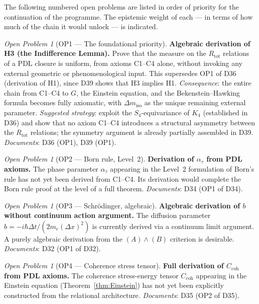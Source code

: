 \documentclass[11pt,a4paper]{article}
\theoremstyle{plain}
\theoremstyle{definition}
\theoremstyle{remark}
\newtheorem{openproblem}[theorem]{Open Problem}
\newcommand{\Kfour}{K_4}
\newcommand{\Rtot}{R_{\mathrm{tot}}}
\begin{document}
The following numbered open problems are listed in order of priority for the continuation of the programme.
The epistemic weight of each — in terms of how much of the chain it would unlock — is indicated.

\begin{openproblem}[OP1 — The foundational priority]
\label{op:H3}
\textbf{Algebraic derivation of H3 (the Indifference Lemma).}
Prove that the measure on the $\Rtot$ relations of a PDL closure is uniform, from axioms C1--C4 alone, without invoking any external geometric or phenomenological input.
This supersedes OP1 of D36 (derivation of H1), since D39 shows that H3 implies H1.
\emph{Consequence}: the entire chain from C1--C4 to $G$, the Einstein equation, and the Bekenstein--Hawking formula becomes fully axiomatic, with $\Delta m_{\mathrm{iso}}$ as the unique remaining external parameter.
\emph{Suggested strategy}: exploit the $S_4$-equivariance of $\Kfour$ (established in D36) and show that no axiom C1--C4 introduces a structural asymmetry between the $\Rtot$ relations; the symmetry argument is already partially assembled in D39.
\emph{Documents}: D36 (OP1), D39 (OP1).
\end{openproblem}

\begin{openproblem}[OP2 — Born rule, Level~2]
\label{op:born_level2}
\textbf{Derivation of $\alpha_\tau$ from PDL axioms.}
The phase parameter $\alpha_\tau$ appearing in the Level~2 formulation of Born's rule has not yet been derived from C1--C4.
Its derivation would complete the Born rule proof at the level of a full theorem.
\emph{Documents}: D34 (OP1 of D34).
\end{openproblem}

\begin{openproblem}[OP3 — Schr\"odinger, algebraic]
\label{op:schrodinger_b}
\textbf{Algebraic derivation of $b$ without continuum action argument.}
The diffusion parameter $b=-i\hbar\Delta t/(2m_e(\Delta x)^2)$ is currently derived via a continuum limit argument.
A purely algebraic derivation from the $(A)\wedge(B)$ criterion is desirable.
\emph{Documents}: D32 (OP1 of D32).
\end{openproblem}

\begin{openproblem}[OP4 — Coherence stress tensor]
\label{op:Ccoh}
\textbf{Full derivation of $C_{\mathrm{coh}}$ from PDL axioms.}
The coherence stress-energy tensor $C_{\mathrm{coh}}$ appearing in the Einstein equation (Theorem~\ref{thm:Einstein}) has not yet been explicitly constructed from the relational architecture.
\emph{Documents}: D35 (OP2 of D35).
\end{openproblem}
\end{document}
